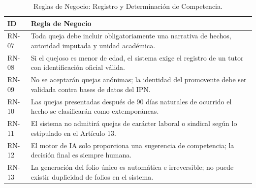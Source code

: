 \begin{table}[h!]
\centering
\scriptsize
\caption{Reglas de Negocio: Registro y Determinación de Competencia.}
\label{tab:rn_competencia}
\begin{tabular}{@{} l p{12cm} @{}}
\toprule
\rowcolor[HTML]{2D3E50} 
\textbf{\color[HTML]{FFFFFF} ID} & \textbf{\color[HTML]{FFFFFF} Regla de Negocio} \\ \midrule
RN-07 & Toda queja debe incluir obligatoriamente una narrativa de hechos, autoridad imputada y unidad académica. \\
\rowcolor[HTML]{F2F4F7} 
RN-08 & Si el quejoso es menor de edad, el sistema exige el registro de un tutor con identificación oficial válida. \\
RN-09 & No se aceptarán quejas anónimas; la identidad del promovente debe ser validada contra bases de datos del IPN. \\
\rowcolor[HTML]{F2F4F7} 
RN-10 & Las quejas presentadas después de 90 días naturales de ocurrido el hecho se clasificarán como extemporáneas. \\
RN-11 & El sistema no admitirá quejas de carácter laboral o sindical según lo estipulado en el Artículo 13. \\
\rowcolor[HTML]{F2F4F7} 
RN-12 & El motor de IA solo proporciona una sugerencia de competencia; la decisión final es siempre humana. \\
RN-13 & La generación del folio único es automática e irreversible; no puede existir duplicidad de folios en el sistema. \\ \bottomrule
\end{tabular}
\end{table}

